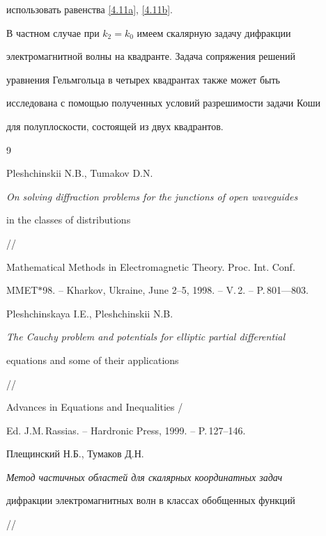 использовать равенства \eqref{4.11a}, \eqref{4.11b}.





В частном случае при $k_2=k_0$ имеем скалярную задачу дифракции


электромагнитной волны на квадранте. Задача сопряжения решений


уравнения Гельмгольца в четырех квадрантах также может быть


исследована с помощью полученных условий разрешимости задачи Коши


для полуплоскости, состоящей из двух квадрантов.








\begin{thebibliography}{9}







Pleshchinskii N.B., Tumakov D.N.


{\em On solving diffraction problems for the junctions of open waveguides


in the classes of distributions} //


Mathematical Methods in Electromagnetic Theory. Proc. Int. Conf.


MMET$\ast$98. -- Kharkov, Ukraine, June 2--5, 1998. -- V.\,2. -- P.\,801---803.







Pleshchinskaya I.E., Pleshchinskii N.B.


{\em The Cauchy problem and potentials for elliptic partial differential


equations and some of their applications} //


Advances in Equations and Inequalities /


Ed. J.M.\,Rassias. -- Hardronic Press, 1999. -- P.\,127--146.







Плещинский Н.Б., Тумаков Д.Н.


{\em Метод частичных областей для скалярных координатных задач


дифракции электромагнитных волн в классах обобщенных функций} //



\end{thebibliography}
